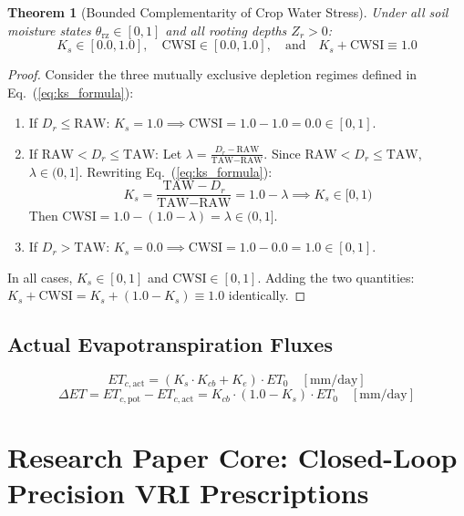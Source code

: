 \documentclass[11pt,a4paper]{article}
\newtheorem{theorem}{Theorem}[section]
\theoremstyle{definition}
\theoremstyle{remark}
\begin{document}
\begin{theorem}[Bounded Complementarity of Crop Water Stress]
Under all soil moisture states $\theta_{\text{rz}} \in [0, 1]$ and all rooting depths $Z_r > 0$:
\begin{equation}
    K_s \in [0.0, 1.0], \quad \text{CWSI} \in [0.0, 1.0], \quad \text{and} \quad K_s + \text{CWSI} \equiv 1.0
\end{equation}
\end{theorem}
\begin{proof}
Consider the three mutually exclusive depletion regimes defined in Eq.~(\ref{eq:ks_formula}):
\begin{enumerate}
    \item If $D_r \le \text{RAW}$: $K_s = 1.0 \implies \text{CWSI} = 1.0 - 1.0 = 0.0 \in [0, 1]$.
    \item If $\text{RAW} < D_r \le \text{TAW}$: Let $\lambda = \frac{D_r - \text{RAW}}{\text{TAW} - \text{RAW}}$. Since $\text{RAW} < D_r \le \text{TAW}$, $\lambda \in (0, 1]$. Rewriting Eq.~(\ref{eq:ks_formula}):
    \begin{equation}
        K_s = \frac{\text{TAW} - D_r}{\text{TAW} - \text{RAW}} = 1.0 - \lambda \implies K_s \in [0, 1)
    \end{equation}
    Then $\text{CWSI} = 1.0 - (1.0 - \lambda) = \lambda \in (0, 1]$.
    \item If $D_r > \text{TAW}$: $K_s = 0.0 \implies \text{CWSI} = 1.0 - 0.0 = 1.0 \in [0, 1]$.
\end{enumerate}
In all cases, $K_s \in [0, 1]$ and $\text{CWSI} \in [0, 1]$. Adding the two quantities: $K_s + \text{CWSI} = K_s + (1.0 - K_s) \equiv 1.0$ identically.
\end{proof}

\subsection{Actual Evapotranspiration Fluxes}
\begin{equation}
    ET_{c,\text{act}} = (K_s \cdot K_{cb} + K_e) \cdot ET_0 \quad [\text{mm/day}]
\end{equation}
\begin{equation}
    \Delta ET = ET_{c,\text{pot}} - ET_{c,\text{act}} = K_{cb} \cdot (1.0 - K_s) \cdot ET_0 \quad [\text{mm/day}]
\end{equation}


\section{Research Paper Core: Closed-Loop Precision VRI Prescriptions}
\end{document}
